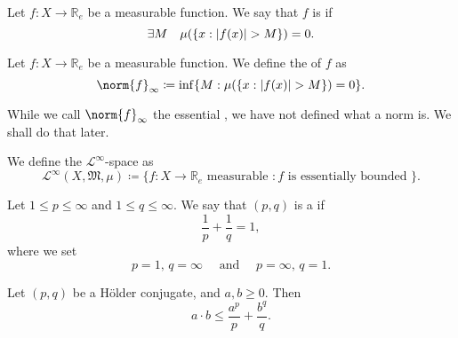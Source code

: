 \documentclass[notoc,notitlepage]{tufte-book}
\begin{document}
\begin{defn}\label{defn:essentially_bounded}
  Let $f : X \to \mathbb{R}_e$ be a measurable function.
  We say that $f$ is  if
  \begin{equation*}
    \exists M \quad \mu (\{ x : \left|f(x)\right| > M \}) = 0.
  \end{equation*}
\end{defn}

\begin{defn}\label{defn:essential_norm}
  Let $f : X \to \mathbb{R}_e$ be a measurable function.
  We define the  of $f$ as
  \begin{equation*}
    \norm{f}_{\infty} \coloneqq \inf \{ M : \mu(\{x : \abs{f(x)} > M \}) = 0 \}.
  \end{equation*}
\end{defn}

\begin{note}
  While we call $\norm{f}_{\infty}$ the essential ,
  we have not defined what a norm is.
  We shall do that later.
\end{note}

\begin{defn}\label{defn:_mathcal_l_infty_space}
  We define the $\mathcal{L}^{\infty}$-space as
  \begin{equation*}
    \mathcal{L}^{\infty}(X, \mathfrak{M}, \mu) \coloneqq \{
      f : X \to \mathbb{R}_e \text{ measurable } : f \text{ is essentially bounded }
    \}.
  \end{equation*}
\end{defn}

\begin{defn}\label{defn:holder_conjugates}
  Let $1 \leq p \leq \infty$ and $1 \leq q \leq \infty$.
  We say that $(p, q)$ is a  if
  \begin{equation*}
    \frac{1}{p} + \frac{1}{q} = 1,
  \end{equation*}
  where we set
  \begin{equation*}
    p = 1,\, q = \infty \quad\text{ and }\quad
    p = \infty,\, q = 1.
  \end{equation*}
\end{defn}

\begin{lemma}\label{lemma:young_s_inequality}
  Let $(p, q)$ be a Hölder conjugate, and $a, b \geq 0$.
  Then
  \begin{equation*}
    a \cdot b \leq \frac{a^p}{p} + \frac{b^q}{q}.
  \end{equation*}
\end{lemma}
\end{document}
